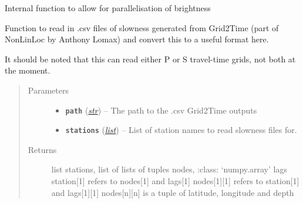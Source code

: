 \documentclass[a4paper,10pt,english]{sphinxmanual}
\begin{document}
\begin{fulllineitems}
\label{modules:bright_lights._node_loop}
Internal function to allow for parallelisation of brightness
\begin{quote}\begin{description}
\end{description}\end{quote}

\end{fulllineitems}


\begin{fulllineitems}
\label{modules:bright_lights._read_tt}
Function to read in .csv files of slowness generated from Grid2Time (part
of NonLinLoc by Anthony Lomax) and convert this to a useful format here.

It should be noted that this can read either P or S travel-time grids, not
both at the moment.
\begin{quote}\begin{description}
\item[{Parameters}] \leavevmode\begin{itemize}
\item {} 
\textbf{\texttt{path}} (\href{https://docs.python.org/library/functions.html\#str}{\emph{str}}) -- The path to the .csv Grid2Time outputs

\item {} 
\textbf{\texttt{stations}} (\href{https://docs.python.org/library/functions.html\#list}{\emph{list}}) -- List of station names to read slowness files for.

\end{itemize}

\item[{Returns}] \leavevmode
list stations, list of lists of tuples nodes,     :class: `numpy.array' lags station{[}1{]} refers to nodes{[}1{]} and     lags{[}1{]} nodes{[}1{]}{[}1{]} refers to station{[}1{]} and lags{[}1{]}{[}1{]}    nodes{[}n{]}{[}n{]} is a tuple of latitude, longitude and depth

\end{description}\end{quote}

\end{fulllineitems}
\end{document}
